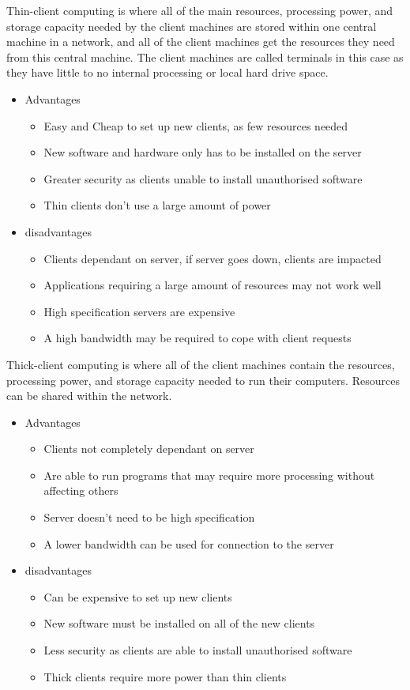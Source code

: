   \noindent
  Thin-client computing is where all of the main resources, processing power, and storage capacity needed by the client machines are stored within one central machine in a network, and all of the client machines get the resources they need from this central machine. The client machines are called terminals in this case as they have little to no internal processing or local hard drive space.
  \begin{itemize}
  	\item Advantages
  	\begin{itemize}
  		\item Easy and Cheap to set up new clients, as few resources needed
  		\item New software and hardware only has to be installed on the server
  		\item Greater security as clients unable to install unauthorised software
  		\item Thin clients don't use a large amount of power
  	\end{itemize}
  	\item disadvantages
  	\begin{itemize}
  		\item Clients dependant on server, if server goes down, clients are impacted
  		\item Applications requiring a large amount of resources may not work well
  		\item High specification servers are expensive
  		\item A high bandwidth may be required to cope with client requests
  	\end{itemize}
  \end{itemize}
  
  
  Thick-client computing is where all of the client machines contain the resources, processing power, and storage capacity needed to run their computers. Resources can be shared within the network.
  \begin{itemize}
  	\item Advantages
  	\begin{itemize}
  		\item Clients not completely dependant on server
  		\item Are able to run programs that may require more processing without affecting others
  		\item Server doesn't need to be high specification
  		\item A lower bandwidth can be used for connection to the server
  	\end{itemize}
  	\item disadvantages
  	\begin{itemize}
  		\item Can be expensive to set up new clients
  		\item New software must be installed on all of the new clients
  		\item Less security as clients are able to install unauthorised software
  		\item Thick clients require more power than thin clients
  	\end{itemize}
  \end{itemize}